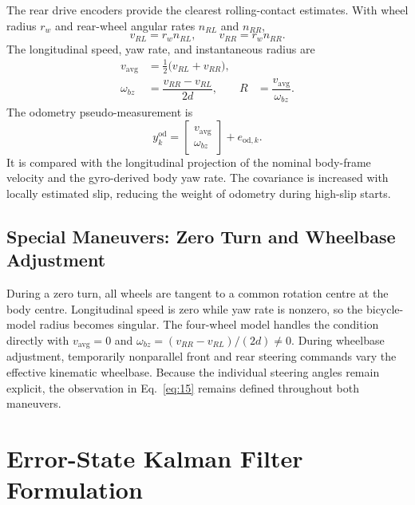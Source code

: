 \documentclass[]{IAC_style}
\begin{document}
The rear drive encoders provide the clearest rolling-contact estimates. With wheel radius $r_w$ and rear-wheel angular rates $n_{RL}$ and $n_{RR}$,
\begin{equation}
\tag{13}\label{eq:13}
v_{RL}=r_wn_{RL},\qquad v_{RR}=r_wn_{RR}.
\end{equation}
The longitudinal speed, yaw rate, and instantaneous radius are
\begin{equation}
\tag{14}\label{eq:14}
\begin{aligned}
v_{\mathrm{avg}}&=\tfrac12\bigl(v_{RL}+v_{RR}\bigr),\\
\omega_{bz}&=\dfrac{v_{RR}-v_{RL}}{2d},
&R&=\dfrac{v_{\mathrm{avg}}}{\omega_{bz}}.
\end{aligned}
\end{equation}
The odometry pseudo-measurement is
\begin{equation}
\tag{15}\label{eq:15}
y_k^{\mathrm{od}}=\begin{bmatrix}v_{\mathrm{avg}}\\\omega_{bz}\end{bmatrix}+e_{\mathrm{od},k}.
\end{equation}
It is compared with the longitudinal projection of the nominal body-frame velocity and the gyro-derived body yaw rate. The covariance is increased with locally estimated slip, reducing the weight of odometry during high-slip starts.

\subsection{Special Maneuvers: Zero Turn and Wheelbase Adjustment}

During a zero turn, all wheels are tangent to a common rotation centre at the body centre. Longitudinal speed is zero while yaw rate is nonzero, so the bicycle-model radius becomes singular. The four-wheel model handles the condition directly with $v_{\mathrm{avg}}=0$ and $\omega_{bz}=(v_{RR}-v_{RL})/(2d)\neq0$. During wheelbase adjustment, temporarily nonparallel front and rear steering commands vary the effective kinematic wheelbase. Because the individual steering angles remain explicit, the observation in Eq.~\eqref{eq:15} remains defined throughout both maneuvers.

\section{Error-State Kalman Filter Formulation}
\end{document}
